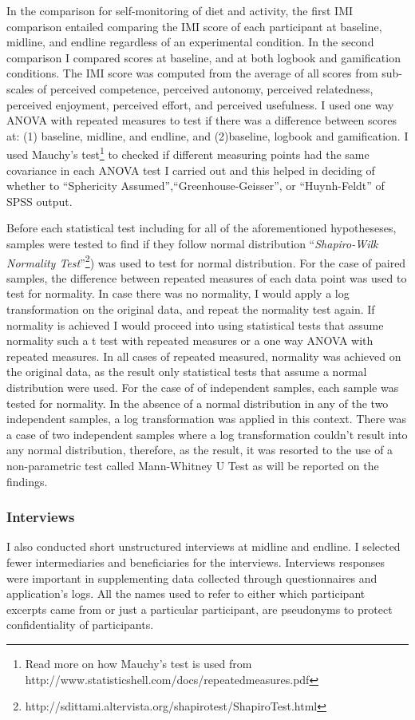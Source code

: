 In the comparison for self-monitoring of diet and activity, the first IMI comparison  entailed comparing the IMI score of each participant at baseline, midline, and endline regardless of an experimental condition. In the second comparison I compared scores at baseline, and at both logbook and gamification conditions. The IMI score was computed from the average of all scores from sub-scales of perceived competence, perceived autonomy, perceived relatedness, perceived enjoyment, perceived effort,  and perceived usefulness. I  used one way ANOVA with repeated measures to test if there was a difference  between scores at: (1) baseline, midline, and endline, and (2)baseline, logbook and gamification. I used Mauchy's test\footnote{Read more on how Mauchy's test is used from http://www.statisticshell.com/docs/repeatedmeasures.pdf} to checked if different measuring points had the same covariance in each ANOVA test I carried out and this helped in deciding of whether to ``Sphericity Assumed'',``Greenhouse-Geisser'', or ``Huynh-Feldt'' of SPSS output.

Before each statistical test including for all of the aforementioned hypotheseses, samples were tested to find if they follow normal distribution ``\emph{Shapiro-Wilk Normality Test}''\footnote{http://sdittami.altervista.org/shapirotest/ShapiroTest.html}) was used to test for normal distribution. For the case of paired samples, the difference between repeated measures of each data point was used to test for normality. In case there was no normality, I would apply a log transformation on the original data, and repeat the normality test again. If normality is achieved I would proceed into using statistical tests that assume normality such a t test with repeated measures or a one way ANOVA with repeated measures. In all cases of repeated measured, normality was achieved on the original data, as the result only statistical tests that assume a  normal distribution were used.  For the case of of independent samples, each sample was tested for normality. In the absence of a normal distribution in any of the two independent samples, a log transformation was applied in this context. There was a case of two independent samples where a log transformation couldn't result into any normal distribution, therefore, as the result, it was resorted to the use of a non-parametric test called Mann-Whitney U Test as will be reported on the findings. 
 
\subsubsection{Interviews}
I also conducted short unstructured interviews at midline and endline. I selected fewer intermediaries and beneficiaries for the interviews. Interviews responses were important in supplementing data collected through questionnaires and application's logs. All the names used to refer to either which participant excerpts came from or just a particular participant, are pseudonyms to protect confidentiality of participants.
